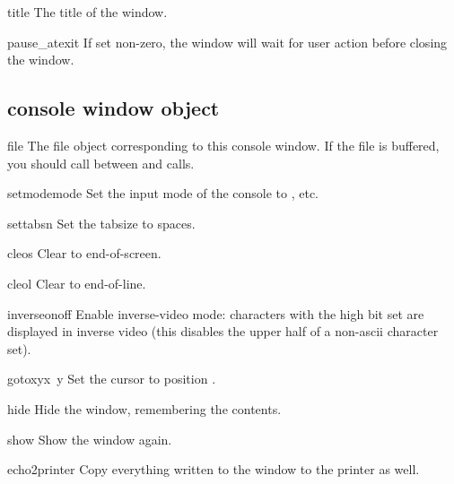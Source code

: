 \begin{datadesc}{title}
The title of the window.
\end{datadesc}

\begin{datadesc}{pause_atexit}
If set non-zero, the window will wait for user action before closing
the window.
\end{datadesc}

\subsection{console window object}

\renewcommand{\indexsubitem}{(console window method)}

\begin{datadesc}{file}
The file object corresponding to this console window. If the file is
buffered, you should call  between 
and  calls.
\end{datadesc}

\begin{funcdesc}{setmode}{mode}
Set the input mode of the console to , etc.
\end{funcdesc}

\begin{funcdesc}{settabs}{n}
Set the tabsize to  spaces.
\end{funcdesc}

\begin{funcdesc}{cleos}{}
Clear to end-of-screen.
\end{funcdesc}

\begin{funcdesc}{cleol}{}
Clear to end-of-line.
\end{funcdesc}

\begin{funcdesc}{inverse}{onoff}
Enable inverse-video mode: characters with the high bit set are
displayed in inverse video (this disables the upper half of a
non-ascii character set).
\end{funcdesc}

\begin{funcdesc}{gotoxy}{x\, y}
Set the cursor to position .
\end{funcdesc}

\begin{funcdesc}{hide}{}
Hide the window, remembering the contents.
\end{funcdesc}

\begin{funcdesc}{show}{}
Show the window again.
\end{funcdesc}

\begin{funcdesc}{echo2printer}{}
Copy everything written to the window to the printer as well.
\end{funcdesc}
